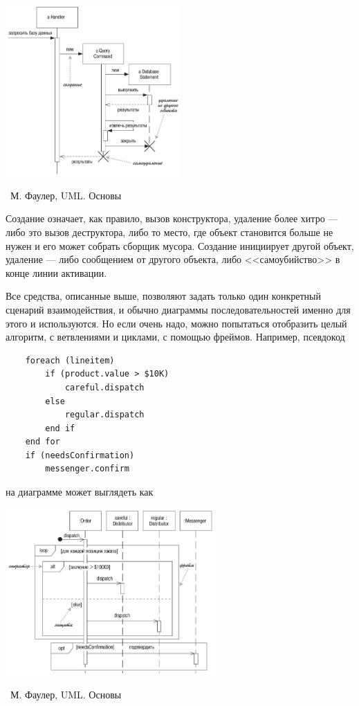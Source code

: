 \documentclass[a5paper]{article}
\newcommand{\attribution}[1] {
	\vspace{-5mm}\begin{flushright}\begin{scriptsize}%
	{\textcopyright\, #1}\end{scriptsize}\end{flushright}
}
\begin{document}
\begin{center}
	\includegraphics[width=0.5\textwidth]{sequenceDiagramCreationAndDeletion.png}
	\attribution{М. Фаулер, UML. Основы}
\end{center}

Создание означает, как правило, вызов конструктора, удаление более хитро --- либо это вызов деструктора, либо то место, где объект становится больше не нужен и его может собрать сборщик мусора. Создание инициирует другой объект, удаление --- либо сообщением от другого объекта, либо <<самоубийство>> в конце линии активации.

Все средства, описанные выше, позволяют задать только один конкретный сценарий взаимодействия, и обычно диаграммы последовательностей именно для этого и используются. Но если очень надо, можно попытаться отобразить целый алгоритм, с ветвлениями и циклами, с помощью фреймов. Например, псевдокод

\begin{verbatim}
    foreach (lineitem)
        if (product.value > $10K)
            careful.dispatch
        else
            regular.dispatch
        end if
    end for
    if (needsConfirmation) 
        messenger.confirm
\end{verbatim}

на диаграмме может выглядеть как

\begin{center}
	\includegraphics[width=0.6\textwidth]{sequenceDiagramFrames.png}
	\attribution{М. Фаулер, UML. Основы}
\end{center}
\end{document}
